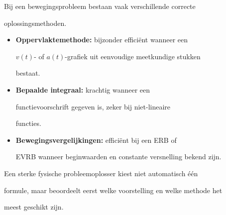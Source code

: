 \documentclass{ximera}
\begin{document}

Bij een bewegingsprobleem bestaan vaak verschillende correcte

oplossingsmethoden.

\begin{itemize}

 \item \textbf{Oppervlaktemethode:} bijzonder efficiënt wanneer een

    $v(t)$- of $a(t)$-grafiek uit eenvoudige meetkundige stukken

    bestaat.

 \item \textbf{Bepaalde integraal:} krachtig wanneer een

    functievoorschrift gegeven is, zeker bij niet-lineaire

    functies.

 \item \textbf{Bewegingsvergelijkingen:} efficiënt bij een ERB of

    EVRB wanneer beginwaarden en constante versnelling bekend zijn.

\end{itemize}

Een sterke fysische probleemoplosser kiest niet automatisch één

formule, maar beoordeelt eerst welke voorstelling en welke methode het

meest geschikt zijn.
\end{document}
